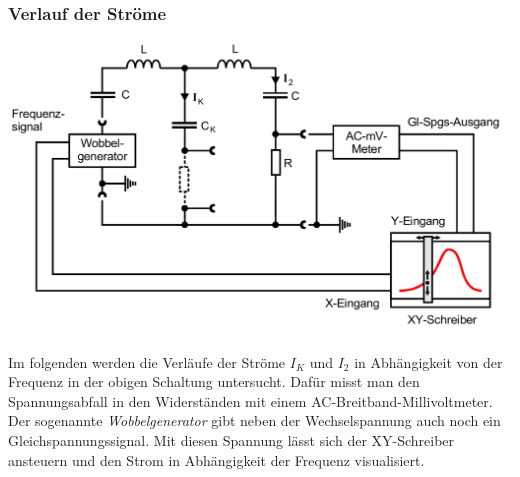 \subsubsection*{Verlauf der Ströme}

\includegraphics[width=\textwidth]{pictures/stromkurven.png}

Im folgenden werden die Verläufe der Ströme $I_{K}$ und $I_{2}$ in Abhängigkeit von der Frequenz
in der obigen Schaltung untersucht.
Dafür misst man den Spannungsabfall in den Widerständen mit einem AC-Breitband-Millivoltmeter.
Der sogenannte \textit{Wobbelgenerator} gibt neben der Wechselspannung auch noch ein Gleichspannungssignal.
Mit diesen Spannung lässt sich der XY-Schreiber ansteuern und  den Strom in Abhängigkeit der Frequenz visualisiert.
